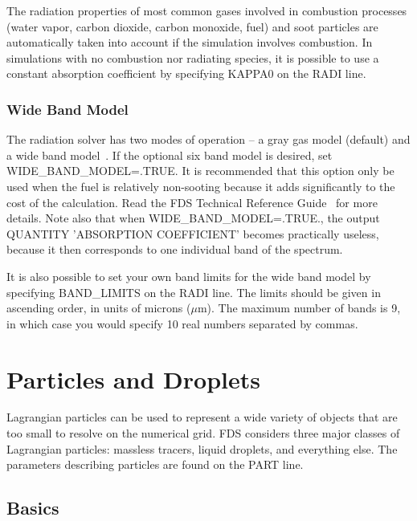 \documentclass[11pt]{book}
\begin{document}
The radiation properties of most common gases involved in combustion processes (water vapor, carbon dioxide, carbon monoxide, fuel) and
soot particles are automatically taken into account if the simulation involves combustion. In simulations with no combustion nor radiating species, it is
possible to use a constant absorption coefficient by specifying {\ct KAPPA0} on the {\ct RADI} line.


\subsection{Wide Band Model}

\label{info:RADI_Wide_Band}

The radiation solver has two modes of
operation -- a gray gas model (default) and a wide band model~\cite{FDS_Math_Guide}.
If the optional six band model is desired,
set {\ct WIDE\_BAND\_MODEL=.TRUE.} It is recommended that this option
only be used when the fuel is relatively non-sooting because it
adds significantly to the cost of the calculation. Read the FDS Technical
Reference Guide~\cite{FDS_Tech_Guide} for more details. Note also that when
{\ct WIDE\_BAND\_MODEL=.TRUE.}, the output {\ct QUANTITY} {\ct 'ABSORPTION COEFFICIENT'}
becomes practically useless, because it then
corresponds to one individual band of the spectrum.

It is also possible to set your own band limits for the wide band model by specifying {\ct BAND\_LIMITS} on the {\ct RADI} line. The limits should be given in ascending order, in units of microns ($\mu$m). The maximum number of bands is 9, in which case you would specify 10 real numbers separated by commas.









\chapter{Particles and Droplets}
\label{info:PART}


Lagrangian particles can be used to represent a wide variety of objects that are too small to resolve on the numerical grid. FDS considers three major classes of Lagrangian particles: massless tracers, liquid droplets, and everything else. The parameters describing particles are found on the {\ct PART} line.



\section{Basics}
\label{info:PART_Basics}
\end{document}
